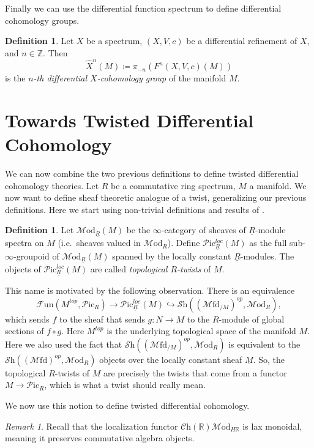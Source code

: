 \documentclass[a4paper]{book}
\newcommand{\lC}{\mathcal{C}}
\newcommand{\lF}{\mathcal{F}}
\newcommand{\lM}{\mathcal{M}}
\newcommand{\lP}{\mathcal{P}}
\newcommand{\bR}{\mathbb{R}}
\newcommand{\lS}{\mathcal{S}}
\newcommand{\bZ}{\mathbb{Z}}
\newcommand{\Fun}{\lF\mathrm{un}} %
\newcommand{\Shv}{\lS\mathrm{h}} %
\newcommand{\Ch}{\lC\mathrm{h}} %
\newcommand{\Mfd}{\lM\mathrm{fd}} %
\newcommand{\Mod}{\lM\mathrm{od}} %
\newcommand{\Pic}{\lP\mathrm{ic}} %
\theoremstyle{definition}
\newtheorem{definition}[equation]{Definition}
\theoremstyle{remark}
\newtheorem{remark}[equation]{Remark}
\numberwithin{equation}{section}
\begin{document}
Finally we can use the differential function spectrum to define differential cohomology groups.

\begin{definition}
  Let $X$ be a spectrum, $(X,V,c)$ be a differential refinement of $X$, and $n \in \bZ$. Then 
  \[ \hat{X}^n(M) \coloneq \pi_{-n}(F^n(X,V,c)(M))\]
  is the \emph{$n$-th differential $X$-cohomology group} of the manifold $M$.
\end{definition}

\section{Towards Twisted Differential Cohomology}
We can now combine the two previous definitions to define twisted differential cohomology theories. Let $R$ be a commutative ring spectrum, $M$ a manifold. We now want to define sheaf theoretic analogue of a twist, generalizing our previous definitions. Here we start using non-trivial definitions and results of \cite{bunkegepner2021diffktheory}.

\begin{definition}
  Let $\Mod_{\underline{R}}(M)$ be the $\infty$-category of sheaves of $\underline{R}$-module spectra on $M$ (i.e.~sheaves valued in $\Mod_R$). Define $\Pic^{loc}_{\underline{R}}(M)$ as the full sub-$\infty$-groupoid of $\Mod_{\underline{R}}(M)$ spanned by the locally constant $\underline{R}$-modules. The objects of $\Pic^{loc}_{\underline{R}}(M)$ are called \emph{topological $R$-twists} of $M$.
\end{definition}

This name is motivated by the following observation. There is an equivalence 
\[ \Fun(M^{top},\Pic_R) \to \Pic^{loc}_{\underline{R}}(M) \hookrightarrow \Shv((\Mfd_{/M})^{op},\Mod_R),\]
which sends $f$ to the sheaf that sends $g\colon N \to M$ to the $R$-module of global sections of $f\circ g$. Here $M^{top}$ is the underlying topological space of the manifold $M$. Here we also used the fact that $\Shv((\Mfd_{/M})^{op},\Mod_R)$ is equivalent to the $\Shv((\Mfd)^{op},\Mod_R)$ objects over the locally constant sheaf $\underline{M}$. So, the topological $R$-twists of $M$ are precisely the twists that come from a functor $M \to \Pic_R$, which is what a twist should really mean.


We now use this notion to define twisted differential cohomology. 

\begin{remark}
  Recall that the localization functor $\Ch(\bR) \Mod_{H\bR}$ is lax monoidal, meaning it preserves commutative algebra objects. 
\end{remark}
\end{document}
